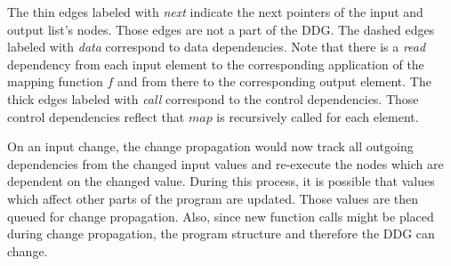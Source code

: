 The thin edges labeled with \textit{next} indicate the next pointers of the input and output list's nodes. Those edges are not a part of the DDG. The dashed edges labeled with \textit{data} correspond to data dependencies. Note that there is a \textit{read} dependency from each input element to the corresponding application of the mapping function $f$ and from there to the corresponding output element. The thick edges labeled with \textit{call} correspond to the control dependencies. Those control dependencies reflect that $map$ is recursively called for each element. 

On an input change, the change propagation would now track all outgoing dependencies from the changed input values and re-execute the nodes which are dependent on the changed value. During this process, it is possible that values which affect other parts of the program are updated. Those values are then queued for change propagation. Also, since new function calls might be placed during change propagation, the program structure and therefore the DDG can change.  


